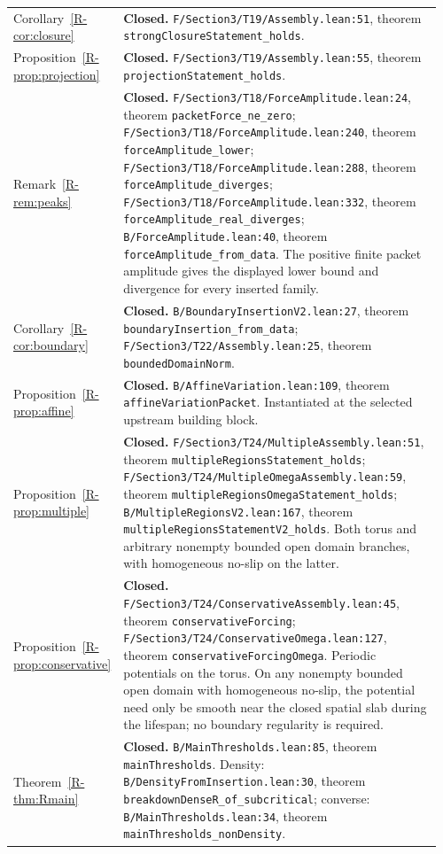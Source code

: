 \documentclass[11pt,a4paper]{article}
\newcommand{\code}[1]{\nolinkurl{#1}}
\newcommand{\paperref}[1]{\ref{R-#1}}
\newcommand{\source}[4]{\code{#1.lean:#2}, #4 \code{#3}}
\newcommand{\mapped}[2]{#1~\paperref{#2}}
\newcommand{\coverage}[1]{\textbf{#1.} }
\begin{document}
\begin{longtable}{@{}>{\raggedright\arraybackslash}p{0.20\linewidth}>{\raggedright\arraybackslash}p{0.76\linewidth}@{}}
\mapped{Corollary}{cor:closure} & \coverage{Closed}\source{F/Section3/T19/Assembly}{51}{strongClosureStatement_holds}{theorem}. \\
\mapped{Proposition}{prop:projection} & \coverage{Closed}\source{F/Section3/T19/Assembly}{55}{projectionStatement_holds}{theorem}. \\
\mapped{Remark}{rem:peaks} & \coverage{Closed}\source{F/Section3/T18/ForceAmplitude}{24}{packetForce_ne_zero}{theorem};
\source{F/Section3/T18/ForceAmplitude}{240}{forceAmplitude_lower}{theorem};
\source{F/Section3/T18/ForceAmplitude}{288}{forceAmplitude_diverges}{theorem};
\source{F/Section3/T18/ForceAmplitude}{332}{forceAmplitude_real_diverges}{theorem};
\source{B/ForceAmplitude}{40}{forceAmplitude_from_data}{theorem}.
The positive finite packet amplitude gives the displayed lower bound and divergence for every inserted family. \\
\mapped{Corollary}{cor:boundary} & \coverage{Closed}\source{B/BoundaryInsertionV2}{27}{boundaryInsertion_from_data}{theorem};
\source{F/Section3/T22/Assembly}{25}{boundedDomainNorm}{theorem}.
\\
\mapped{Proposition}{prop:affine} & \coverage{Closed}\source{B/AffineVariation}{109}{affineVariationPacket}{theorem}. Instantiated at the selected upstream building block. \\
\mapped{Proposition}{prop:multiple} & \coverage{Closed}\source{F/Section3/T24/MultipleAssembly}{51}{multipleRegionsStatement_holds}{theorem};
\source{F/Section3/T24/MultipleOmegaAssembly}{59}{multipleRegionsOmegaStatement_holds}{theorem};
\source{B/MultipleRegionsV2}{167}{multipleRegionsStatementV2_holds}{theorem}.
Both torus and arbitrary nonempty bounded open domain branches, with homogeneous no-slip on the latter. \\
\mapped{Proposition}{prop:conservative} & \coverage{Closed}\source{F/Section3/T24/ConservativeAssembly}{45}{conservativeForcing}{theorem};
\source{F/Section3/T24/ConservativeOmega}{127}{conservativeForcingOmega}{theorem}.
Periodic potentials on the torus. On any nonempty bounded open domain with homogeneous no-slip, the potential need only be smooth near the closed spatial slab during the lifespan; no boundary regularity is required. \\
\mapped{Theorem}{thm:Rmain} & \coverage{Closed}\source{B/MainThresholds}{85}{mainThresholds}{theorem}. Density: \source{B/DensityFromInsertion}{30}{breakdownDenseR_of_subcritical}{theorem}; converse: \source{B/MainThresholds}{34}{mainThresholds_nonDensity}{theorem}. \\

\end{longtable}
\end{document}
